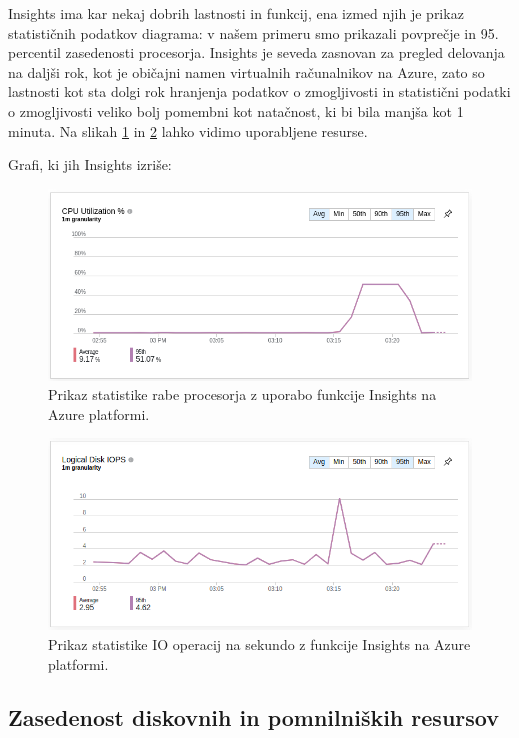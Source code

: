 Insights ima kar nekaj dobrih lastnosti in funkcij, ena izmed njih je prikaz statističnih podatkov diagrama: v našem primeru smo prikazali povprečje in 95. percentil zasedenosti procesorja. Insights je seveda zasnovan za pregled delovanja na daljši rok, kot je običajni namen virtualnih računalnikov na Azure, zato so lastnosti kot sta dolgi rok hranjenja podatkov o zmogljivosti in statistični podatki o zmogljivosti veliko bolj pomembni kot natačnost, ki bi bila manjša kot 1 minuta. Na slikah \ref{3_kekw1} in \ref{3_kekw2} lahko vidimo uporabljene resurse.

Grafi, ki jih Insights izriše:

\begin{figure}[H]
	\centering
	\includegraphics[scale=0.46]{Img/3_insights_cpu.png}
	\caption{Prikaz statistike rabe procesorja z uporabo funkcije Insights na Azure platformi.}
	\label{3_kekw1}
\end{figure}

\begin{figure}[H]
	\centering
	\includegraphics[scale=0.46]{Img/3_insights_iops.png}
	\caption{Prikaz statistike IO operacij na sekundo z funkcije Insights na Azure platformi.}
	\label{3_kekw2}
\end{figure}

\subsection{Zasedenost diskovnih in pomnilniških resursov}


